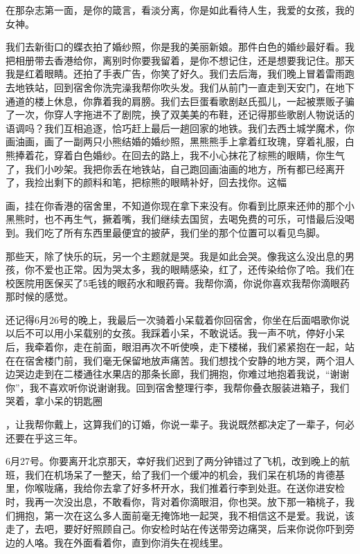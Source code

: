 \documentclass{article}
\begin{document}
在那杂志第一面，是你的箴言，看淡分离，你是如此看待人生，我爱的女孩，我的女神。

我们去新街口的蝶衣拍了婚纱照，你是我的美丽新娘。那件白色的婚纱最好看。我把相册带去香港给你，离别时你要我留着，是你不想记住，还是想要我记住。那天我是红着眼睛。还拍了手表广告，你笑了好久。我们去后海，我们晚上冒着雷雨跑去地铁站，回到宿舍你洗完澡我帮你吹头发。我们从前门一直走到天安门，在地下通道的楼上休息，你靠着我的肩膀。我们去巨蛋看歌剧赵氏孤儿，一起被票贩子骗了一次，你穿人字拖进不了剧院，换了双美美的布鞋，还记得那些歌剧人物说话的语调吗？我们互相追逐，恰巧赶上最后一趟回家的地铁。我们去西土城学魔术，你画油画，画了一副两只小熊结婚的婚纱照，黑熊熊手上拿着红玫瑰，穿着礼服，白熊捧着花，穿着白色婚纱。在回去的路上，我不小心抹花了棕熊的眼睛，你生气了，我们小吵架。我把你丢在地铁站，自己跑回画油画的地方，所有都已经离开了，我捡出剩下的颜料和笔，把棕熊的眼睛补好，回去找你。这幅

\newpage 

画，挂在你香港的宿舍里，不知道你现在拿下来没有。你看到比原来还帅的那个小黑熊时，也不再生气，撅着嘴，我们继续去国贸，去喝免费的可乐，可惜最后没喝到。我们吃了所有东西里最便宜的披萨，我们坐的那个位置可以看见鸟脚。

那些天，除了快乐的玩，另一个主题就是哭。我是如此会哭。像我这么没出息的男孩，你不爱也正常。因为哭太多，我的眼睛感染，红了，还传染给你了哈。我们在校医院用医保买了5毛钱的眼药水和眼药膏。我帮你滴，你说你喜欢我帮你滴眼药那时候的感觉。

还记得6月26号的晚上，我最后一次骑着小呆载着你回宿舍，你坐在后面唱歌你说以后不可以用小呆载别的女孩。我踩着小呆，不敢说话。我一声不吭，停好小呆后，我牵着你，走在前面，眼泪再次不听使唤，走下楼梯，我们紧紧抱在一起，站在在宿舍楼门前，我们毫无保留地放声痛苦。我们想找个安静的地方哭，两个泪人边哭边走到在二楼通往水果店的那条长廊，我们拥抱，你难过地抱着我说，“谢谢你”，我不喜欢听你说谢谢我。回到宿舍整理行李，我帮你叠衣服装进箱子，我们哭着，拿小呆的钥匙圈

\newpage 

，让我帮你戴上，这算我们的订婚，你说一辈子。我说既然都决定了一辈子，何必还要在乎这三年。

6月27号。你要离开北京那天，幸好我们迟到了两分钟错过了飞机，改到晚上的航班，我们在机场呆了一整天，给了我们一个缓冲的机会，我们呆在机场的肯德基里，你喉咙痛，我给你去拿了好多杯开水，我们推着行李到处逛。在送你进安检时，我再一次没出息，不敢看你，背对着你滴眼泪，你也哭。放下那一箱桃子，我们拥抱，第一次在这么多人面前毫无掩饰地一起哭，我不相信这不是爱。我说，该走了，去吧，要好好照顾自己。你安检时站在传送带旁边痛哭，后来你说你吓到旁边的人咯。我在外面看着你，直到你消失在视线里。
\end{document}
